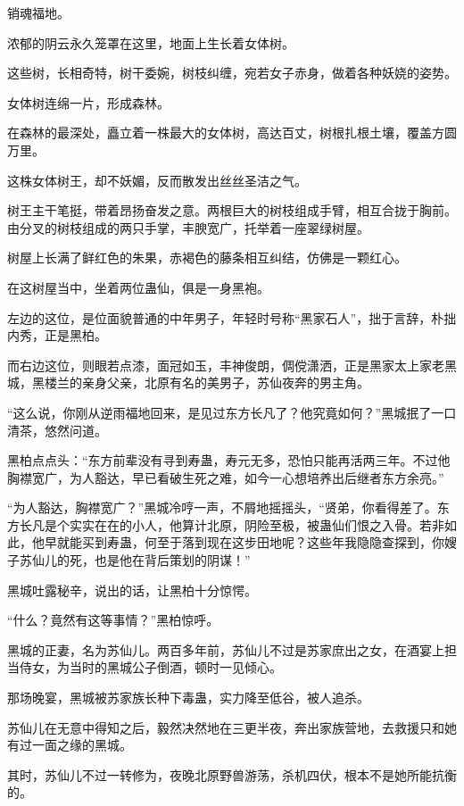 
\begin{this_body}

销魂福地。

浓郁的阴云永久笼罩在这里，地面上生长着女体树。

这些树，长相奇特，树干委婉，树枝纠缠，宛若女子赤身，做着各种妖娆的姿势。

女体树连绵一片，形成森林。

在森林的最深处，矗立着一株最大的女体树，高达百丈，树根扎根土壤，覆盖方圆万里。

这株女体树王，却不妖媚，反而散发出丝丝圣洁之气。

树王主干笔挺，带着昂扬奋发之意。两根巨大的树枝组成手臂，相互合拢于胸前。由分叉的树枝组成的两只手掌，丰腴宽广，托举着一座翠绿树屋。

树屋上长满了鲜红色的朱果，赤褐色的藤条相互纠结，仿佛是一颗红心。

在这树屋当中，坐着两位蛊仙，俱是一身黑袍。

左边的这位，是位面貌普通的中年男子，年轻时号称“黑家石人”，拙于言辞，朴拙内秀，正是黑柏。

而右边这位，则眼若点漆，面冠如玉，丰神俊朗，倜傥潇洒，正是黑家太上家老黑城，黑楼兰的亲身父亲，北原有名的美男子，苏仙夜奔的男主角。

“这么说，你刚从逆雨福地回来，是见过东方长凡了？他究竟如何？”黑城抿了一口清茶，悠然问道。

黑柏点点头：“东方前辈没有寻到寿蛊，寿元无多，恐怕只能再活两三年。不过他胸襟宽广，为人豁达，早已看破生死之难，如今一心想培养出后继者东方余亮。”

“为人豁达，胸襟宽广？”黑城冷哼一声，不屑地摇摇头，“贤弟，你看得差了。东方长凡是个实实在在的小人，他算计北原，阴险至极，被蛊仙们恨之入骨。若非如此，他早就能买到寿蛊，何至于落到现在这步田地呢？这些年我隐隐查探到，你嫂子苏仙儿的死，也是他在背后策划的阴谋！”

黑城吐露秘辛，说出的话，让黑柏十分惊愕。

“什么？竟然有这等事情？”黑柏惊呼。

黑城的正妻，名为苏仙儿。两百多年前，苏仙儿不过是苏家庶出之女，在酒宴上担当侍女，为当时的黑城公子倒酒，顿时一见倾心。

那场晚宴，黑城被苏家族长种下毒蛊，实力降至低谷，被人追杀。

苏仙儿在无意中得知之后，毅然决然地在三更半夜，奔出家族营地，去救援只和她有过一面之缘的黑城。

其时，苏仙儿不过一转修为，夜晚北原野兽游荡，杀机四伏，根本不是她所能抗衡的。


\end{this_body}
